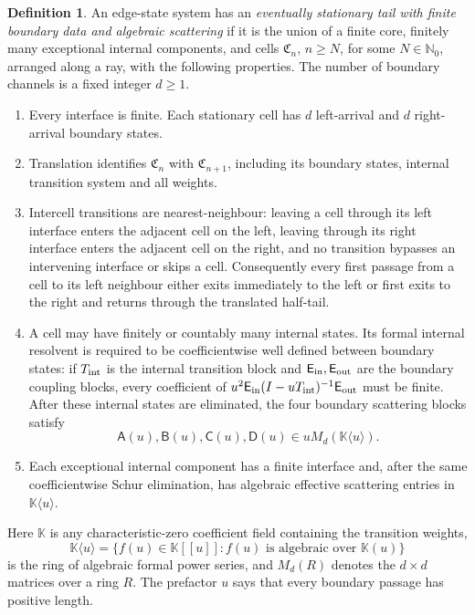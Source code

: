 \documentclass[11pt,reqno]{amsart}
\numberwithin{equation}{section}
\theoremstyle{definition}
\newtheorem{definition}[theorem]{Definition}
\theoremstyle{remark}
\begin{document}
\begin{definition}\label{def:stationarytail}
An edge-state system has an \emph{eventually stationary tail with finite
boundary data and algebraic scattering} if it is the union of a finite core,
finitely many exceptional internal components, and cells $\mathfrak C_n$,
$n\ge N$, for some $N\in\mathbb N_0$, arranged along a ray, with the following
properties.  The number of boundary channels is a fixed integer $d\ge1$.
\begin{enumerate}[label=(\roman*)]
\item Every interface is finite.  Each stationary cell has $d$ left-arrival
and $d$ right-arrival boundary states.
\item Translation identifies $\mathfrak C_n$ with $\mathfrak C_{n+1}$, including its boundary
states, internal transition system and all weights.
\item Intercell transitions are nearest-neighbour: leaving a cell through its
left interface enters the adjacent cell on the left, leaving through its right
interface enters the adjacent cell on the right, and no transition bypasses
an intervening interface or skips a cell.  Consequently every first passage
from a cell to its left neighbour either exits immediately to the left or
first exits to the right and returns through the translated half-tail.
\item A cell may have finitely or countably many internal states.  Its formal
internal resolvent is required to be coefficientwise well defined between
boundary states: if $T_{\rm int}$ is the internal transition block and
$\mathsf E_{\rm in},\mathsf E_{\rm out}$ are the boundary coupling blocks,
every coefficient of
$u^2\mathsf E_{\rm in}(I-uT_{\rm int})^{-1}\mathsf E_{\rm out}$ must be
finite.  After these internal states are eliminated, the four boundary
scattering blocks satisfy
\[
 \mathsf A(u),\mathsf B(u),\mathsf C(u),\mathsf D(u)
 \in uM_d(\mathbb K\langle u\rangle).
\]
\item Each exceptional internal component has a finite interface and, after
the same coefficientwise Schur elimination, has algebraic effective
scattering entries in $\mathbb K\langle u\rangle$.
\end{enumerate}
Here $\mathbb K$ is any characteristic-zero coefficient field containing the
transition weights,
\[
 \mathbb K\langle u\rangle
 =\{f(u)\in\mathbb K[[u]]:f(u)\text{ is algebraic over }\mathbb K(u)\}
\]
is the ring of algebraic formal power series, and $M_d(R)$ denotes the
$d\times d$ matrices over a ring $R$.  The prefactor $u$ says that every
boundary passage has positive length.
\end{definition}
\end{document}
